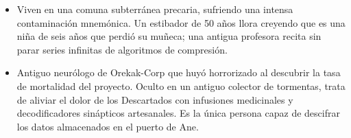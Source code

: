 \begin{itemize}
  \item {} Viven en una comuna subterránea precaria, sufriendo una intensa contaminación mnemónica. Un estibador de 50 años llora creyendo que es una niña de seis años que perdió su muñeca; una antigua profesora recita sin parar series infinitas de algoritmos de compresión.
  \item {} Antiguo neurólogo de Orekak-Corp que huyó horrorizado al descubrir la tasa de mortalidad del proyecto. Oculto en un antiguo colector de tormentas, trata de aliviar el dolor de los Descartados con infusiones medicinales y decodificadores sinápticos artesanales. Es la única persona capaz de descifrar los datos almacenados en el puerto de Ane.
\end{itemize}
